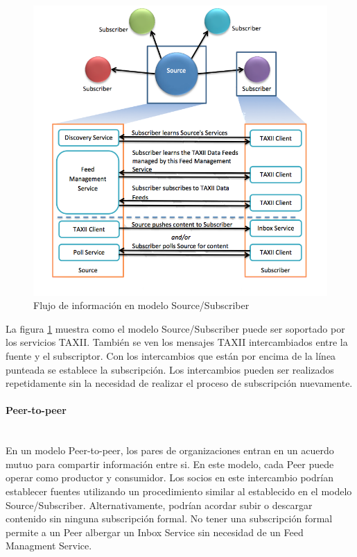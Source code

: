 \begin{figure}[ht!]
 
  \centering
  	\includegraphics[width=150mm]{./images/SourceSuscriberModel.png}
    \caption{Flujo de información en modelo Source/Subscriber \protect\cite{b1}}
    \label{fig.sourcesuscribermodel}
\end{figure}

La figura \ref{fig.sourcesuscribermodel} muestra como el modelo Source/Subscriber puede ser soportado por los 
servicios TAXII. También se ven los mensajes TAXII intercambiados entre la
fuente y el subscriptor. Con los intercambios que están por encima de la línea 
punteada se establece la subscripción. Los intercambios pueden ser realizados 
repetidamente sin la necesidad de realizar el proceso de subscripción 
nuevamente.

\newpage

\paragraph{Peer-to-peer}\ \\ 

En un modelo Peer-to-peer, los pares de organizaciones entran en un acuerdo 
mutuo para compartir información entre si. En este modelo, cada Peer puede 
operar como productor y consumidor. Los socios en este intercambio podrían 
establecer fuentes utilizando un procedimiento similar al establecido en el 
modelo Source/Subscriber. Alternativamente, podrían acordar subir o descargar 
contenido sin ninguna subscripción formal. No tener una subscripción formal 
permite a un Peer albergar un Inbox Service sin necesidad de un Feed 
Managment Service.\\

